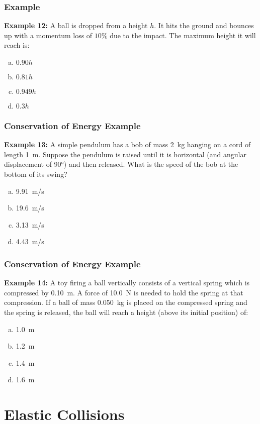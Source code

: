 \documentclass[12pt,compress,aspectratio=169]{beamer}
\begin{document}
\begin{frame}
  \frametitle{Example}
  \textbf{Example 12:} A ball is dropped from a height $h$. It hits the ground
  and bounces up with a momentum loss of $10\%$ due to the impact. The maximum
  height it will reach is:
  \begin{enumerate}[(a)]
  \item $0.90h$
  \item $0.81h$
  \item $0.949h$
  \item $0.3h$
  \end{enumerate}
\end{frame}

\begin{frame}
  \frametitle{Conservation of Energy Example}
  \textbf{Example 13:} A simple pendulum has a bob of mass \SI{2}{kg} hanging
  on a cord of length \SI{1}{m}. Suppose the pendulum is raised until it is
  horizontal (and angular displacement of \ang{90}) and then released. What is
  the speed of the bob at the bottom of its swing?
  \begin{enumerate}[(a)]
  \item\SI{9.91}{m/s}
  \item\SI{19.6}{m/s}
  \item\SI{3.13}{m/s}
  \item\SI{4.43}{m/s}
  \end{enumerate}
\end{frame}
 
\begin{frame}
  \frametitle{Conservation of Energy Example}
  \textbf{Example 14:} A toy firing a ball vertically consists of a vertical
  spring which is compressed by \SI{0.10}{m}. A force of \SI{10.0}{\newton}
  is needed to hold the spring at that compression. If a ball of mass
  \SI{0.050}{kg} is placed on the compressed spring and the spring is released,
  the ball will reach a height (above its initial position) of:
  \begin{enumerate}[(a)]
  \item \SI{1.0}{m}
  \item \SI{1.2}{m}
  \item \SI{1.4}{m}
  \item \SI{1.6}{m}
  \end{enumerate}
\end{frame}


\section{Elastic Collisions}
\end{document}
